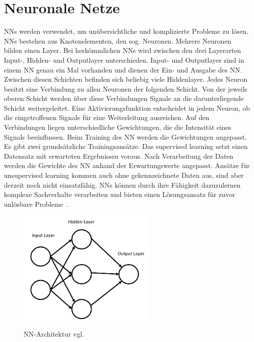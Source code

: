 \section*{Neuronale Netze}
NNs werden verwendet, um unübersichtliche und komplizierte Probleme zu lösen. NNs bestehen aus Knotenelementen, den sog. Neuronen. Mehrere Neuronen bilden einen Layer. Bei herkömmlichen NNs wird zwischen den drei Layerarten Input-, Hidden- und Outputlayer unterschieden. Input- und Outputlayer sind in einem NN genau ein Mal vorhanden und dienen der Ein- und Ausgabe des NN. Zwischen diesen Schichten befinden sich beliebig viele Hiddenlayer. Jedes Neuron besitzt eine Verbindung zu allen Neuronen der folgenden Schicht. Von der jeweils oberen Schicht werden über diese Verbindungen Signale an die darunterliegende Schicht weitergeleitet. Eine Aktivierungsfunktion entscheidet in jedem Neuron, ob die eingetroffenen Signale für eine Weiterleitung ausreichen. Auf den Verbindungen liegen unterschiedliche Gewichtungen, die die Intensität eines Signals beeinflussen. Beim Training des NN werden die Gewichtungen angepasst.
Es gibt zwei grundsätzliche Trainingsansätze. Das supervised learning setzt einen Datensatz mit erwarteten Ergebnissen voraus. Nach Verarbeitung der Daten werden die Gewichte des NN anhand der Erwartungswerte angepasst. Ansätze für unsupervised learning kommen auch ohne gekennzeichnete Daten aus, sind aber derzeit noch nicht einsatzfähig. NNs können durch ihre Fähigkeit dazuzulernen komplexe Sachverhalte verarbeiten und bieten einen Lösungsansatz für zuvor unlösbare Probleme~\cite{Maind2014}.\\
\begin{figure}[h]
\includegraphics[width=\linewidth, height=6cm]{Bilder/NN/NeuralNetwork.png}
\caption{NN-Architektur vgl.~\cite{Maind2014}}
\end{figure}
\\
\\
\\
